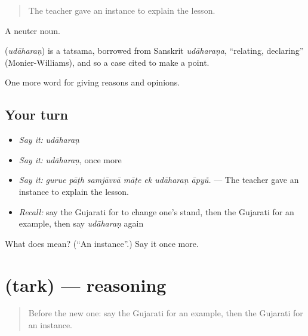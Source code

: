 \begin{quote}
The teacher gave an instance to explain the lesson.
\end{quote}

A neuter noun.

\begin{cousinweb}
\textbf{} (\emph{udāharaṇ}) is a tatsama, borrowed from Sanskrit \emph{udāharaṇa}, \textquotedblleft{}relating, declaring\textquotedblright{} (Monier-Williams), and so a case cited to make a point.
\end{cousinweb}

\begin{grammarlens}[title={What you've built}]
One more word for giving reasons and opinions.
\end{grammarlens}

\subsection*{Your turn}
\begin{itemize}
\raggedright
  \item \emph{Say it:} \emph{udāharaṇ}
  \item \emph{Say it:} \emph{udāharaṇ}, once more
  \item \emph{Say it:} \emph{gurue pāṭh samjāvvā māṭe ek udāharaṇ āpyũ.} — The teacher gave an instance to explain the lesson.
  \item \emph{Recall:} say the Gujarati for to change one's stand, then the Gujarati for an example, then say \emph{udāharaṇ} again
\end{itemize}

\begin{tcolorbox}[breakable,colback=teal!4,colframe=teal!35!black,title={Before you move on}]
What does  mean? (\textquotedblleft{}An instance\textquotedblright{}.) Say it once more.
\end{tcolorbox}
\section[\texorpdfstring{\gu{તર્ક} (tark)}{તર્ક (tark)}]{ (tark) — reasoning}

\label{lesson:GU-C346-tark}



\begin{quote}
Before the new one: say the Gujarati for an example, then the Gujarati for an instance.
\end{quote}

